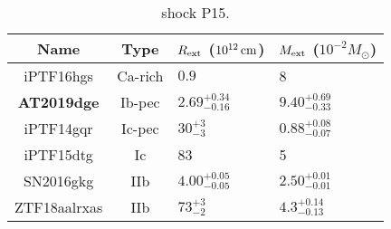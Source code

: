 \begin{table}[!htbp] 
	\centering 
	\caption{shock P15.} 
	\begin{tabular}{ccll} 
		\hline 
		Name  &Type & $R_{\rm ext}$ ($10^{12}\,{\rm cm}$) & $M_{\rm ext}$ ($10^{-2} M_\odot$)  \\ 
		\hline
		iPTF16hgs & Ca-rich & $0.9$ & 8\\
		\textbf{AT2019dge} & Ib-pec & $2.69_{-0.16}^{+0.34}$ & $9.40_{-0.33}^{+0.69}$  \\
		iPTF14gqr & Ic-pec &$30^{+3}_{-3}$ &$0.88^{+0.08}_{-0.07}$  \\
		iPTF15dtg & Ic & 83&5 \\
		SN2016gkg & IIb &$4.00^{+0.05}_{-0.05}$ &$2.50^{+0.01}_{-0.01}$  \\
		ZTF18aalrxas & IIb & $73^{+3}_{-2}$  & $4.3_{-0.13}^{+0.14}$ \\
		\hline 
	\end{tabular} 
\end{table} 
